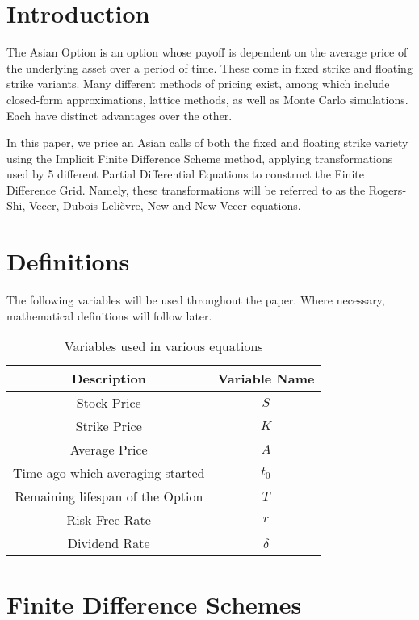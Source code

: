 \documentclass{article}
\begin{document}
\tableofcontents

\newpage

\section{Introduction}

The Asian Option is an option whose payoff is dependent on the average price of the underlying asset over a period of time. These come in fixed strike and floating strike variants. Many different methods of pricing exist, among which include closed-form approximations, lattice methods, as well as Monte Carlo simulations. Each have distinct advantages over the other.

In this paper, we price an Asian calls of both the fixed and floating strike variety using the Implicit Finite Difference Scheme method, applying transformations used by 5 different Partial Differential Equations to construct the Finite Difference Grid. Namely, these transformations will be referred to as the Rogers-Shi, Vecer, Dubois-Leli\`evre, New and New-Vecer equations.

\section{Definitions}
The following variables will be used throughout the paper. Where necessary, mathematical definitions will follow later.
\begin{table}[H]
  \begin{tabular}{|c|c|}
    \hline
    \textbf{Description} & \textbf{Variable Name} \\ \hline
    Stock Price & \(S\) \\
    Strike Price & \(K\)\\
    Average Price & \(A\) \\
    Time ago which averaging started & \(t_0\) \\
    Remaining lifespan of the Option & \(T\) \\
    Risk Free Rate & \(r\) \\
    Dividend Rate & \(\delta\) \\
    \hline
  \end{tabular}
  \caption{Variables used in various equations}
  \label{table:name}
\end{table}

\section{Finite Difference Schemes}
\end{document}
